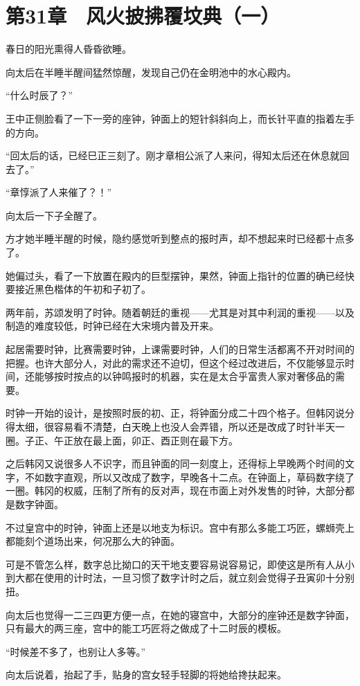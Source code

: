 \section{第31章　风火披拂覆坟典（一）}

春日的阳光熏得人昏昏欲睡。

向太后在半睡半醒间猛然惊醒，发现自己仍在金明池中的水心殿内。

“什么时辰了？”

王中正侧脸看了一下一旁的座钟，钟面上的短针斜斜向上，而长针平直的指着左手的方向。

“回太后的话，已经巳正三刻了。刚才章相公派了人来问，得知太后还在休息就回去了。”

“章惇派了人来催了？！”

向太后一下子全醒了。

方才她半睡半醒的时候，隐约感觉听到整点的报时声，却不想起来时已经都十点多了。

她偏过头，看了一下放置在殿内的巨型摆钟，果然，钟面上指针的位置的确已经快要接近黑色楷体的午初和子初了。

两年前，苏颂发明了时钟。随着朝廷的重视——尤其是对其中利润的重视——以及制造的难度较低，时钟已经在大宋境内普及开来。

起居需要时钟，比赛需要时钟，上课需要时钟，人们的日常生活都离不开对时间的把握。也许大部分人，对此的需求还不迫切，但这个经过改进后，不仅能够显示时间，还能够按时按点的以钟鸣报时的机器，实在是太合乎富贵人家对奢侈品的需要。

时钟一开始的设计，是按照时辰的初、正，将钟面分成二十四个格子。但韩冈说分得太细，很容易看不清楚，白天晚上也没人会弄错，所以还是改成了时针半天一圈。子正、午正放在最上面，卯正、酉正则在最下方。

之后韩冈又说很多人不识字，而且钟面的同一刻度上，还得标上早晚两个时间的文字，不如数字直观，所以又改成了数字，早晚各十二点。在钟面上，草码数字绕了一圈。韩冈的权威，压制了所有的反对声，现在市面上对外发售的时钟，大部分都是数字钟面。

不过皇宫中的时钟，钟面上还是以地支为标识。宫中有那么多能工巧匠，螺蛳壳上都能刻个道场出来，何况那么大的钟面。

可是不管怎么样，数字总比拗口的天干地支要容易说容易记，即使这是所有人从小到大都在使用的计时法，一旦习惯了数字计时之后，就立刻会觉得子丑寅卯十分别扭。

向太后也觉得一二三四更方便一点，在她的寝宫中，大部分的座钟还是数字钟面，只有最大的两三座，宫中的能工巧匠将之做成了十二时辰的模板。

“时候差不多了，也别让人多等。”

向太后说着，抬起了手，贴身的宫女轻手轻脚的将她给搀扶起来。

